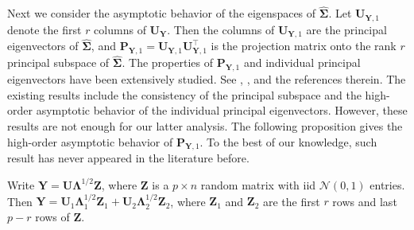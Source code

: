 \documentclass[12pt]{article} %
\newcommand{\bZ}{\mathbf{Z}}
\newcommand{\bP}{\mathbf{P}}
\newcommand{\bY}{\mathbf{Y}}
\newcommand{\bU}{\mathbf{U}}
\newcommand{\bfsym}[1]{\ensuremath{\boldsymbol{#1}}}
\def\bLambda {\bfsym {\Lambda}}
\def\bSigma {\bfsym {\Sigma}}
\theoremstyle{definition}
\begin{document}
Next we consider the asymptotic behavior of the eigenspaces of $\hat{\bSigma}$.
Let $\bU_{\bY,1}$ denote the first $r$ columns of $\bU_{\bY}$.
Then the columns of $\bU_{\bY,1}$ are the principal eigenvectors of $\hat{\bSigma}$, and $\bP_{\bY,1}=\bU_{\bY,1}\bU_{\bY,1}^\top$ is the projection matrix onto the rank $r$ principal subspace of $\hat{\bSigma}$.
The properties of $\bP_{\bY,1}$ and individual principal eigenvectors have been extensively studied.
See \cite{Cai2015Optimal}, \cite{Shen2016A}, \cite{wang2017As} and the references therein.
The existing results include the consistency of the principal subspace and the high-order asymptotic behavior of the individual principal eigenvectors.
However, these results are not enough for our latter analysis.
The following proposition gives the high-order asymptotic behavior of $\bP_{\bY,1}$.
To the best of our knowledge, such result has never appeared in the literature before.



Write $\bY=\bU\bLambda^{1/2}\bZ$, where $\bZ$ is a $p\times n$ random matrix with iid $\mathcal{N}(0,1)$ entries.
    Then $\bY=\bU_1 \bLambda_1^{1/2} \bZ_1 +\bU_2 \bLambda_2^{1/2} \bZ_2$, where $\bZ_1$ and $\bZ_2$ are the first $r$ rows and last $p-r$ rows of $\bZ$.
\end{document}
